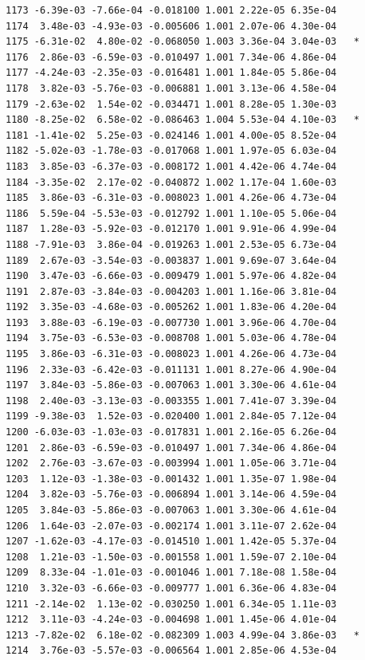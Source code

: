 \documentclass[
  letterpaper,
  DIV=11,
  numbers=noendperiod]{scrartcl}
\begin{document}
\begin{verbatim}
1173 -6.39e-03 -7.66e-04 -0.018100 1.001 2.22e-05 6.35e-04    
1174  3.48e-03 -4.93e-03 -0.005606 1.001 2.07e-06 4.30e-04    
1175 -6.31e-02  4.80e-02 -0.068050 1.003 3.36e-04 3.04e-03   *
1176  2.86e-03 -6.59e-03 -0.010497 1.001 7.34e-06 4.86e-04    
1177 -4.24e-03 -2.35e-03 -0.016481 1.001 1.84e-05 5.86e-04    
1178  3.82e-03 -5.76e-03 -0.006881 1.001 3.13e-06 4.58e-04    
1179 -2.63e-02  1.54e-02 -0.034471 1.001 8.28e-05 1.30e-03    
1180 -8.25e-02  6.58e-02 -0.086463 1.004 5.53e-04 4.10e-03   *
1181 -1.41e-02  5.25e-03 -0.024146 1.001 4.00e-05 8.52e-04    
1182 -5.02e-03 -1.78e-03 -0.017068 1.001 1.97e-05 6.03e-04    
1183  3.85e-03 -6.37e-03 -0.008172 1.001 4.42e-06 4.74e-04    
1184 -3.35e-02  2.17e-02 -0.040872 1.002 1.17e-04 1.60e-03    
1185  3.86e-03 -6.31e-03 -0.008023 1.001 4.26e-06 4.73e-04    
1186  5.59e-04 -5.53e-03 -0.012792 1.001 1.10e-05 5.06e-04    
1187  1.28e-03 -5.92e-03 -0.012170 1.001 9.91e-06 4.99e-04    
1188 -7.91e-03  3.86e-04 -0.019263 1.001 2.53e-05 6.73e-04    
1189  2.67e-03 -3.54e-03 -0.003837 1.001 9.69e-07 3.64e-04    
1190  3.47e-03 -6.66e-03 -0.009479 1.001 5.97e-06 4.82e-04    
1191  2.87e-03 -3.84e-03 -0.004203 1.001 1.16e-06 3.81e-04    
1192  3.35e-03 -4.68e-03 -0.005262 1.001 1.83e-06 4.20e-04    
1193  3.88e-03 -6.19e-03 -0.007730 1.001 3.96e-06 4.70e-04    
1194  3.75e-03 -6.53e-03 -0.008708 1.001 5.03e-06 4.78e-04    
1195  3.86e-03 -6.31e-03 -0.008023 1.001 4.26e-06 4.73e-04    
1196  2.33e-03 -6.42e-03 -0.011131 1.001 8.27e-06 4.90e-04    
1197  3.84e-03 -5.86e-03 -0.007063 1.001 3.30e-06 4.61e-04    
1198  2.40e-03 -3.13e-03 -0.003355 1.001 7.41e-07 3.39e-04    
1199 -9.38e-03  1.52e-03 -0.020400 1.001 2.84e-05 7.12e-04    
1200 -6.03e-03 -1.03e-03 -0.017831 1.001 2.16e-05 6.26e-04    
1201  2.86e-03 -6.59e-03 -0.010497 1.001 7.34e-06 4.86e-04    
1202  2.76e-03 -3.67e-03 -0.003994 1.001 1.05e-06 3.71e-04    
1203  1.12e-03 -1.38e-03 -0.001432 1.001 1.35e-07 1.98e-04    
1204  3.82e-03 -5.76e-03 -0.006894 1.001 3.14e-06 4.59e-04    
1205  3.84e-03 -5.86e-03 -0.007063 1.001 3.30e-06 4.61e-04    
1206  1.64e-03 -2.07e-03 -0.002174 1.001 3.11e-07 2.62e-04    
1207 -1.62e-03 -4.17e-03 -0.014510 1.001 1.42e-05 5.37e-04    
1208  1.21e-03 -1.50e-03 -0.001558 1.001 1.59e-07 2.10e-04    
1209  8.33e-04 -1.01e-03 -0.001046 1.001 7.18e-08 1.58e-04    
1210  3.32e-03 -6.66e-03 -0.009777 1.001 6.36e-06 4.83e-04    
1211 -2.14e-02  1.13e-02 -0.030250 1.001 6.34e-05 1.11e-03    
1212  3.11e-03 -4.24e-03 -0.004698 1.001 1.45e-06 4.01e-04    
1213 -7.82e-02  6.18e-02 -0.082309 1.003 4.99e-04 3.86e-03   *
1214  3.76e-03 -5.57e-03 -0.006564 1.001 2.85e-06 4.53e-04    

\end{verbatim}
\end{document}
